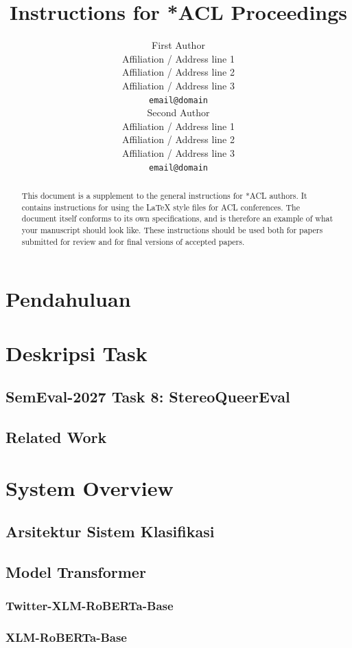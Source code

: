 \documentclass[11pt]{article}
\title{Instructions for *ACL Proceedings}
\author{First Author \\
  Affiliation / Address line 1 \\
  Affiliation / Address line 2 \\
  Affiliation / Address line 3 \\
  \texttt{email@domain} \\\And
  Second Author \\
  Affiliation / Address line 1 \\
  Affiliation / Address line 2 \\
  Affiliation / Address line 3 \\
  \texttt{email@domain} \\}
\begin{document}
\maketitle
\begin{abstract}
This document is a supplement to the general instructions for *ACL authors. It contains instructions for using the \LaTeX{} style files for ACL conferences.
The document itself conforms to its own specifications, and is therefore an example of what your manuscript should look like.
These instructions should be used both for papers submitted for review and for final versions of accepted papers.
\end{abstract}

\section{Pendahuluan}

\section{Deskripsi Task}
\subsection{SemEval-2027 Task 8: StereoQueerEval}

\subsection{Related Work}

\section{System Overview}
\subsection{Arsitektur Sistem Klasifikasi}

\subsection{Model Transformer}

\subsubsection{Twitter-XLM-RoBERTa-Base}

\subsubsection{XLM-RoBERTa-Base}
\end{document}
